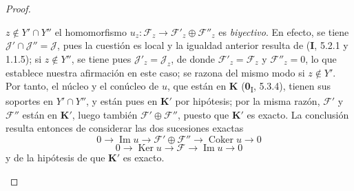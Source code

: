 \begin{proof}
\begin{enumerate}
$z\notin Y'\cap Y''$ el homomorfismo
$u_z:\mathcal F_z\to\mathcal F'_z\oplus\mathcal F''_z$ es \emph{biyectivo}.
En efecto, se tiene $\mathcal J'\cap\mathcal J''=\mathcal J$, pues la cuestión es
local y
la igualdad anterior resulta de (\textbf{I}, 5.2.1 y 1.1.5); si $z\notin Y''$, se tiene
pues $\mathcal J'_z=\mathcal J_z$, de donde $\mathcal F'_z=\mathcal F_z$ y
$\mathcal F''_z=0$, lo que establece nuestra afirmación en este caso; se razona
del mismo modo si $z\notin Y'$. Por tanto, el núcleo y el conúcleo de $u$, que están
en $\boldsymbol{K}$ (\textbf{0}\textsubscript{I}, 5.3.4), tienen sus soportes en $Y'\cap Y''$,
y están pues en $\boldsymbol{K}'$ por hipótesis; por la misma razón, $\mathcal F'$ y
$\mathcal F''$ están en $\boldsymbol{K}'$, luego también $\mathcal F'\oplus\mathcal F''$,
puesto que $\boldsymbol{K}'$ es exacto. La conclusión resulta entonces de considerar las
dos sucesiones exactas
\[
0\longrightarrow\operatorname{Im}u\longrightarrow
\mathcal F'\oplus\mathcal F''\longrightarrow
\operatorname{Coker}u\longrightarrow0
\]
\[
0\longrightarrow\operatorname{Ker}u\longrightarrow\mathcal F
\longrightarrow\operatorname{Im}u\longrightarrow0
\]
y de la hipótesis de que $\boldsymbol{K}'$ es exacto.


\end{enumerate}
\end{proof}

